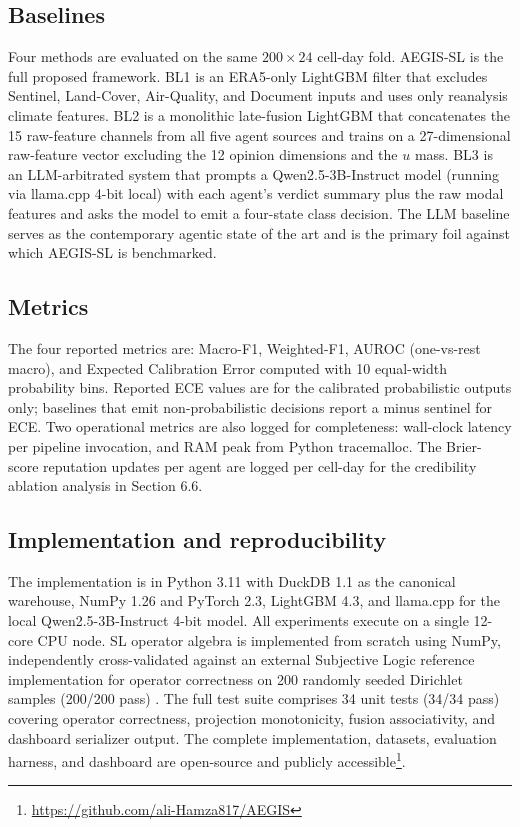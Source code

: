 \subsection{Baselines}

Four methods are evaluated on the same $200 \times 24$ cell-day fold. AEGIS-SL is the full proposed framework. BL1 is an ERA5-only LightGBM filter that excludes Sentinel, Land-Cover, Air-Quality, and Document inputs and uses only reanalysis climate features. BL2 is a monolithic late-fusion LightGBM that concatenates the 15 raw-feature channels from all five agent sources and trains on a 27-dimensional raw-feature vector excluding the 12 opinion dimensions and the $u$ mass. BL3 is an LLM-arbitrated system that prompts a Qwen2.5-3B-Instruct model (running via llama.cpp 4-bit local) with each agent's verdict summary plus the raw modal features and asks the model to emit a four-state class decision. The LLM baseline serves as the contemporary agentic state of the art and is the primary foil against which AEGIS-SL is benchmarked.

\subsection{Metrics}

The four reported metrics are: Macro-F1, Weighted-F1, AUROC (one-vs-rest macro), and Expected Calibration Error computed with 10 equal-width probability bins. Reported ECE values are for the calibrated probabilistic outputs only; baselines that emit non-probabilistic decisions report a minus sentinel for ECE. Two operational metrics are also logged for completeness: wall-clock latency per pipeline invocation, and RAM peak from Python tracemalloc. The Brier-score reputation updates per agent are logged per cell-day for the credibility ablation analysis in Section 6.6.

\subsection{Implementation and reproducibility}

The implementation is in Python 3.11 with DuckDB 1.1 as the canonical warehouse, NumPy 1.26 and PyTorch 2.3, LightGBM 4.3, and llama.cpp for the local Qwen2.5-3B-Instruct 4-bit model. All experiments execute on a single 12-core CPU node. SL operator algebra is implemented from scratch using NumPy, independently cross-validated against an external Subjective Logic reference implementation for operator correctness on 200 randomly seeded Dirichlet samples (200/200 pass) \citep{vanderheijden2018multisource}. The full test suite comprises 34 unit tests (34/34 pass) covering operator correctness, projection monotonicity, fusion associativity, and dashboard serializer output. The complete implementation, datasets, evaluation harness, and dashboard are open-source and publicly accessible\footnote{\url{https://github.com/ali-Hamza817/AEGIS}}.
